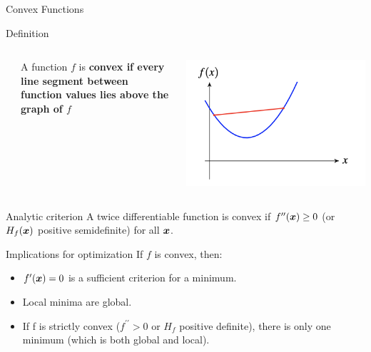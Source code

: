 \documentclass[10pt]{beamer}
\begin{document}
\begin{frame}{Convex Functions}

\begin{sblock}{Definition}
\begin{columns}
\begin{column}{.02\textwidth}
\end{column}
\begin{column}{.68\textwidth}
A function $f$ is \bf{convex} if every line segment between function values lies above the graph of $f$
\end{column}
\begin{column}{.3\textwidth}
\includegraphics[width=\textwidth]{images/convexity}
\end{column}

\end{columns}
\end{sblock}

\begin{sblock}{Analytic criterion}
 A twice differentiable function is convex if $f^{\prime \prime}({\boldsymbol x}) \geq 0$ (or $H_f ({\boldsymbol x})$ positive semidefinite) for all ${\boldsymbol x}$.
\end{sblock}  
  
\begin{sblock}{Implications for optimization}
If $f$ is convex, then:
\begin{itemize}
\item $f^\prime ({\boldsymbol x}) = 0$ is a sufficient criterion for a minimum. 
\item Local minima are global.
\item If f is strictly convex ($f^{\prime \prime} > 0$ or $H_f$ positive definite), there is only one minimum (which is both global and local).
\end{itemize}
\end{sblock}

\end{frame}
\end{document}
